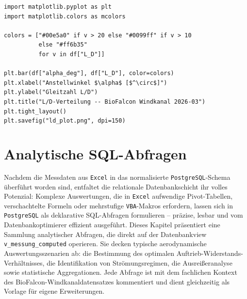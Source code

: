 ﻿\documentclass[12pt,a4paper]{report}
\theoremstyle{definition}
\theoremstyle{remark}
\newcommand{\excel}{\texttt{Excel}}
\newcommand{\vba}{\texttt{VBA}}
\newcommand{\pg}{\texttt{PostgreSQL}}
\newcommand{\code}[1]{\texttt{#1}}
\begin{document}
\begin{lstlisting}[style=python, caption={Python-\"Aquivalent: matplotlib Farbkodierung}]
import matplotlib.pyplot as plt
import matplotlib.colors as mcolors

colors = ["#00e5a0" if v > 20 else "#0099ff" if v > 10
          else "#ff6b35"
          for v in df["L_D"]]

plt.bar(df["alpha_deg"], df["L_D"], color=colors)
plt.xlabel("Anstellwinkel $\alpha$ [$^\circ$]")
plt.ylabel("Gleitzahl L/D")
plt.title("L/D-Verteilung -- BioFalcon Windkanal 2026-03")
plt.tight_layout()
plt.savefig("ld_plot.png", dpi=150)
\end{lstlisting}

\chapter{Analytische SQL-Abfragen}

Nachdem die Messdaten aus \excel{} in das normalisierte \pg{}-Schema überführt worden sind, entfaltet die relationale Datenbankschicht ihr volles Potenzial: Komplexe Auswertungen, die in \excel{} aufwendige Pivot-Tabellen, verschachtelte Formeln oder mehrstufige \vba{}-Makros erfordern, lassen sich in \pg{} als deklarative SQL-Abfragen formulieren -- präzise, lesbar und vom Datenbankoptimierer effizient ausgeführt. Dieses Kapitel präsentiert eine Sammlung analytischer Abfragen, die direkt auf der Datenbankview \code{v\_messung\_computed} operieren. Sie decken typische aerodynamische Auswertungsszenarien ab: die Bestimmung des optimalen Auftrieb-Widerstands-Verhältnisses, die Identifikation von Strömungsregimen, die Ausreißeranalyse sowie statistische Aggregationen. Jede Abfrage ist mit dem fachlichen Kontext des BioFalcon-Windkanaldatensatzes kommentiert und dient gleichzeitig als Vorlage für eigene Erweiterungen.
\end{document}
